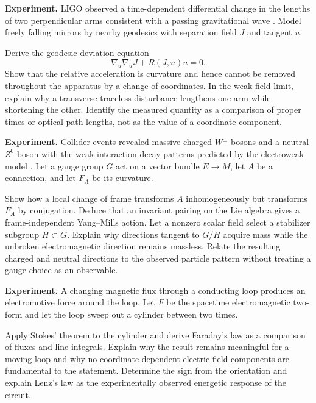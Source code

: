 \begin{exercise}
\textbf{Experiment.}
LIGO observed a time-dependent differential change in the lengths of two
perpendicular arms consistent with a passing gravitational wave
\cite{ligo}.  Model freely falling mirrors by nearby geodesics with separation
field \(J\) and tangent \(u\).

Derive the geodesic-deviation equation
\[
        \nabla_u\nabla_uJ+R(J,u)u=0.
\]
Show that the relative acceleration is curvature and hence cannot be removed
throughout the apparatus by a change of coordinates.  In the weak-field
limit, explain why a transverse traceless disturbance lengthens one arm while
shortening the other.  Identify the measured quantity as a comparison of
proper times or optical path lengths, not as the value of a coordinate
component.
\end{exercise}

\begin{exercise}
\textbf{Experiment.}
Collider events revealed massive charged \(W^\pm\) bosons and a neutral
\(Z^0\) boson with the weak-interaction decay patterns predicted by the
electroweak model \cite{ua1-w,ua1-z}.  Let a gauge group \(G\) act on a vector
bundle \(E\to M\), let \(A\) be a connection, and let
\(F_A\) be its curvature.

Show how a local change of frame transforms \(A\) inhomogeneously but
transforms \(F_A\) by conjugation.  Deduce that an invariant pairing on the
Lie algebra gives a frame-independent Yang--Mills action.  Let a nonzero
scalar field select a stabilizer subgroup \(H\subset G\).  Explain why
directions tangent to \(G/H\) acquire mass while the unbroken electromagnetic
direction remains massless.  Relate the resulting charged and neutral
directions to the observed particle pattern without treating a gauge choice
as an observable.
\end{exercise}

\begin{exercise}
\textbf{Experiment.}
A changing magnetic flux through a conducting loop produces an electromotive
force around the loop.  Let \(F\) be the spacetime electromagnetic two-form
and let the loop sweep out a cylinder between two times.

Apply Stokes' theorem to the cylinder and derive Faraday's law as a comparison
of fluxes and line integrals.  Explain why the result remains meaningful for a
moving loop and why no coordinate-dependent electric field components are
fundamental to the statement.  Determine the sign from the orientation and
explain Lenz's law as the experimentally observed energetic response of the
circuit.
\end{exercise}

